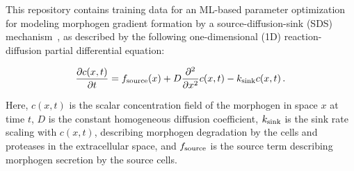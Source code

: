 \documentclass[11pt]{article}
\begin{document}
This repository contains training data for an ML-based parameter optimization for modeling morphogen gradient formation by a source-diffusion-sink (SDS) mechanism~\cite{Yu2009}, as described by the following one-dimensional (1D) reaction-diffusion partial differential equation:

\begin{equation}\label{eq:SDS_1D_PDE}
	\frac{\partial c(x,t)}{\partial t} = f_{\rm{source}}(x) + D\frac{\partial^2 }{\partial x^2}c(x,t) - k_{\rm{sink}}c(x,t)\,.
\end{equation}

Here, $c(x,t)$ is the scalar concentration field of the morphogen in space $x$ at time $t$, $D$ is the constant homogeneous diffusion coefficient, $k_{\rm{sink}}$ is the sink rate scaling with $c(x,t)$, describing morphogen degradation by the cells and proteases in the extracellular space, and $f_{\rm{source}}$ is the source term describing morphogen secretion by the source cells. 
\end{document}
